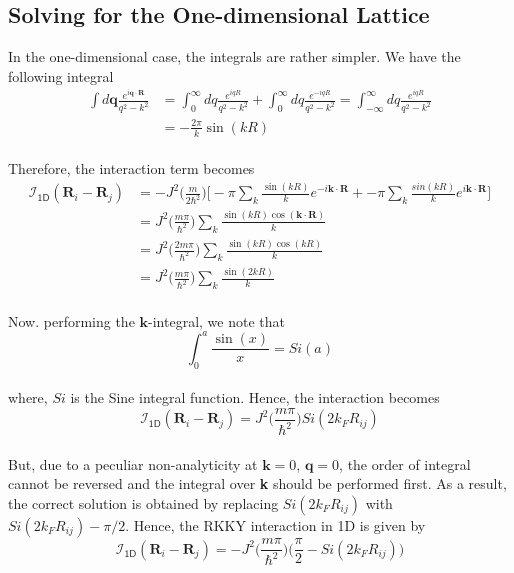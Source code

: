 \documentclass{article}
\begin{document}
\subsection{Solving for the One-dimensional Lattice}
In the one-dimensional case, the integrals are rather simpler. We have the following integral
\\
\begin{equation}
\begin{split}
\int d\textbf{q} \frac{e^{i \textbf{q} \cdot \textbf{R}}}{q^2 - k^2} & = \int_{0}^{\infty} dq \frac{e^{i qR}}{q^2 - k^2}  + \int_{0}^{\infty} dq \frac{e^{-i qR}}{q^2 - k^2} = \int_{-\infty}^{\infty} dq \frac{e^{i qR}}{q^2 - k^2}\\
& = -\frac{2\pi}{k} \sin(kR)
\end{split}
\end{equation}
\\
Therefore, the interaction term becomes
\\
\begin{equation}
\begin{split}
\mathcal{I}_{\textsf{1D}}(\textbf{R}_i - \textbf{R}_j) & = -J^2 \Bigg(\frac{m}{2\hbar^2} \Bigg)\Bigg[-\pi\sum_{k} \frac{ \sin(kR)}{k}e^{-i\textbf{k} \cdot \textbf{R}}    + -\pi\sum_{k} \frac{sin(kR)}{k}e^{i\textbf{k} \cdot \textbf{R}}\Bigg]\\
& = J^2 \Bigg(\frac{m\pi}{\hbar^2} \Bigg) \sum_{k}\frac{\sin(kR)\cos(\textbf{k} \cdot \textbf{R})}{k}\\
& = J^2 \Bigg(\frac{2m\pi}{\hbar^2} \Bigg) \sum_{k}\frac{\sin(kR)\cos(kR)}{k}\\
& = J^2 \Bigg(\frac{m\pi}{\hbar^2} \Bigg)\sum_{k}\frac{\sin(2kR)}{k}
\end{split}
\end{equation}
\\
Now. performing the $\textbf{k}$-integral, we note that
\\
\begin{equation}
\int_{0}^{a} \frac{\sin(x)}{x} = Si(a)
\end{equation}
\\
where, $Si$ is the Sine integral function. Hence, the interaction becomes
\\
\begin{equation}
\mathcal{I}_{\textsf{1D}}(\textbf{R}_i - \textbf{R}_j) = J^2 \Bigg(\frac{m\pi}{\hbar^2}\Bigg) Si(2k_FR_{ij})
\end{equation} 
\\
But, due to a peculiar non-analyticity at $\textbf{k}=0$, $\textbf{q}=0$, the order of integral cannot be reversed and the integral over \textbf{k} should be performed first. As a result, the correct solution is obtained by replacing $Si(2k_FR_{ij})$ with $Si(2k_FR_{ij}) - \pi/2$. Hence, the RKKY interaction in 1D is given by
\\
\begin{equation}
\mathcal{I}_{\textsf{1D}}(\textbf{R}_i - \textbf{R}_j) = -J^2 \Bigg(\frac{m\pi}{\hbar^2}\Bigg)\Bigg(\frac{\pi}{2} - Si(2k_FR_{ij})\Bigg)
\end{equation}
\end{document}
